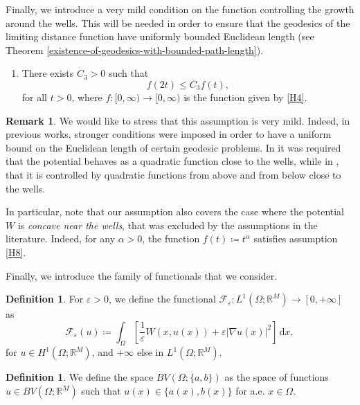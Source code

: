 \documentclass[a4paper, 11pt, reqno]{amsart}
\theoremstyle{plain}
\theoremstyle{definition}
\newtheorem{definition}[theorem]{Definition}
\newtheorem{remark}[theorem]{Remark}
\theoremstyle{remark}
\newcommand{\R}{\mathbb R}
\newcommand{\dd}{\,\mathrm{d}}
\begin{document}
Finally, we introduce a very mild condition on the function controlling the growth around the wells. This will be needed in order to ensure that the geodesics of the limiting distance function have uniformly bounded Euclidean length (see Theorem \ref{existence-of-geodesics-with-bounded-path-length}).

\begin{enumerate}[resume, label=(H\arabic*), ref=(H\arabic*)]
            \item \label{H8} There exists $C_3>0$ such that
            \[
            f(2t) \leq C_3 f(t),
            \]
            for all $t>0$, where $f\colon[0,\infty)\to[0,\infty)$ is the function given by \ref{H4}.
\end{enumerate}

\begin{remark}
We would like to stress that this assumption is very mild.
Indeed, in previous works, stronger conditions were imposed in order to have a uniform bound on the Euclidean length of certain geodesic problems.
In \cite{CriGra} it was required that the potential behaves as a quadratic function close to the wells, while in \cite{CriFonGan_moving_sub}, that it is controlled by quadratic functions from above and from below close to the wells.

In particular, note that our assumption also covers the case where the potential $W$ is \emph{concave near the wells}, that was excluded by the assumptions in the literature.
Indeed, for any $\alpha>0$, the function $f(t)\coloneqq t^\alpha$ satisfies assumption \ref{H8}.
\end{remark}

Finally, we introduce the family of functionals that we consider.

\begin{definition}
For $\varepsilon>0$, we define the functional $\mathcal{F}_\varepsilon\colon L^1(\Omega;\R^M)\to[0,+\infty]$ as
\[
\mathcal{F}_\varepsilon(u) \coloneqq \int_\Omega \left[ \frac{1}{\varepsilon} W(x,u(x))
    + \varepsilon|\nabla u(x)|^2 \right] \dd x,
\]
for $u\in H^1(\Omega;\R^M)$, and $+\infty$ else in $L^1(\Omega;\R^M)$.
\end{definition}

\begin{definition}
    We define the space $BV(\Omega;\{a,b\})$ as the space of functions $u\in BV(\Omega;\R^M)$ such that $u(x)\in\{ a(x), b(x) \}$ for a.e. $x\in\Omega$.
\end{definition}
	
\end{document}
